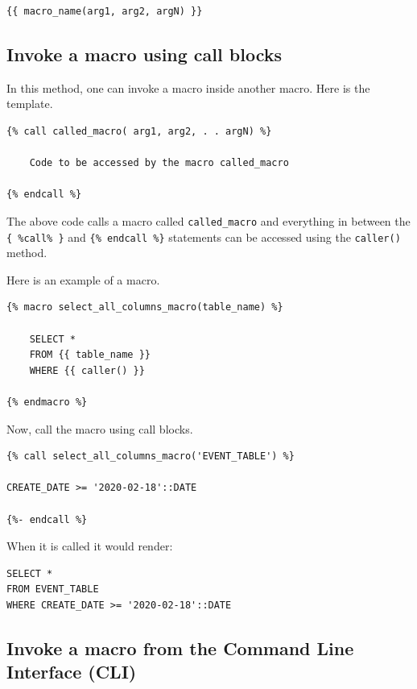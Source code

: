 \documentclass[
]{book}
\begin{document}
\begin{verbatim}
{{ macro_name(arg1, arg2, argN) }}
\end{verbatim}

\hypertarget{invoke-a-macro-using-call-blocks}{%
\subsection{Invoke a macro using call blocks}\label{invoke-a-macro-using-call-blocks}}

In this method, one can invoke a macro inside another macro. Here is the template.

\begin{verbatim}
{% call called_macro( arg1, arg2, . . argN) %}

    Code to be accessed by the macro called_macro

{% endcall %}
\end{verbatim}

The above code calls a macro called \texttt{called\_macro} and everything in between the \texttt{\{\ \%call\%\ \}} and \texttt{\{\%\ endcall\ \%\}} statements can be accessed using the \texttt{caller()} method.

Here is an example of a macro.

\begin{verbatim}
{% macro select_all_columns_macro(table_name) %}

    SELECT *
    FROM {{ table_name }}
    WHERE {{ caller() }}

{% endmacro %}
\end{verbatim}

Now, call the macro using call blocks.

\begin{verbatim}
{% call select_all_columns_macro('EVENT_TABLE') %}

CREATE_DATE >= '2020-02-18'::DATE

{%- endcall %}
\end{verbatim}

When it is called it would render:

\begin{verbatim}
SELECT *
FROM EVENT_TABLE
WHERE CREATE_DATE >= '2020-02-18'::DATE
\end{verbatim}

\hypertarget{invoke-a-macro-from-the-command-line-interface-cli}{%
\subsection{Invoke a macro from the Command Line Interface (CLI)}\label{invoke-a-macro-from-the-command-line-interface-cli}}
\end{document}

